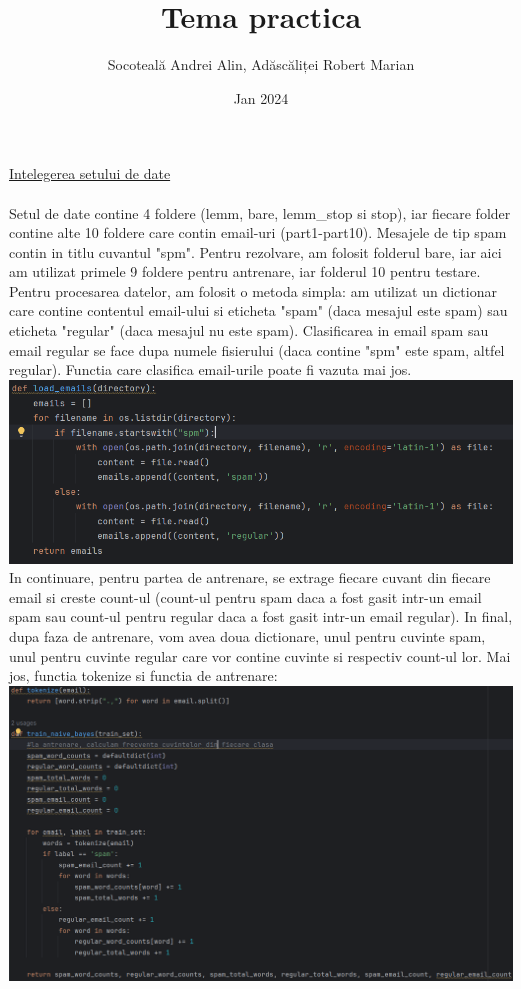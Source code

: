 \documentclass[11pt,leqno]{article}
\title{Tema practica}
\author{Socoteală Andrei Alin, Adăscăliței Robert Marian}
\date{Jan 2024}
\begin{document}
	\maketitle
	\vspace{5mm}
{\large \underline{ Intelegerea setului de date} }
	\\\\
	{\normalsize 
		Setul de date contine 4 foldere (lemm, bare, lemm\_stop si stop), iar fiecare folder contine alte 10 foldere care contin email-uri (part1-part10). Mesajele de tip spam contin in titlu cuvantul "spm". Pentru rezolvare, am folosit folderul bare, iar aici am utilizat primele 9 foldere pentru antrenare, iar folderul 10 pentru testare. Pentru procesarea datelor, am folosit o metoda simpla: am utilizat un dictionar care contine contentul email-ului si eticheta "spam" (daca mesajul este spam) sau eticheta "regular" (daca mesajul nu este spam). Clasificarea in email spam sau email regular se face dupa numele fisierului (daca contine "spm" este spam, altfel regular). Functia care clasifica email-urile poate fi vazuta mai jos. \\
		\includegraphics[scale=0.8]{load}
		\\
		In continuare, pentru partea de antrenare, se extrage fiecare cuvant din fiecare email si creste count-ul (count-ul pentru spam daca a fost gasit intr-un email spam sau count-ul pentru regular daca a fost gasit intr-un email regular). In final, dupa faza de antrenare, vom avea doua dictionare, unul pentru cuvinte spam, unul pentru cuvinte regular care vor contine cuvinte si respectiv count-ul lor. Mai jos, functia tokenize si functia de antrenare:\\
		\includegraphics[scale=0.6]{train}
	}
\end{document}
